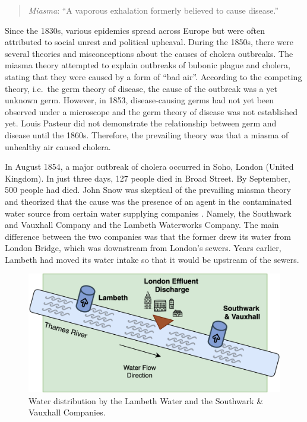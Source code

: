 \documentclass[
]{book}
\begin{document}
\begin{quote}
\emph{Miasma}: ``A vaporous exhalation formerly believed to cause disease.''
\end{quote}

Since the 1830s, various epidemics spread across Europe but were often attributed to social unrest and political upheaval. During the 1850s, there were several theories and misconceptions about the causes of cholera outbreaks. The miasma theory attempted to explain outbreaks of bubonic plague and cholera, stating that they were caused by a form of ``bad air''. According to the competing theory, i.e.~the germ theory of disease, the cause of the outbreak was a yet unknown germ. However, in 1853, disease-causing germs had not yet been observed under a microscope and the germ theory of disease was not established yet. Louis Pasteur did not demonstrate the relationship between germ and disease until the 1860s. Therefore, the prevailing theory was that a miasma of unhealthy air caused cholera.

In August 1854, a major outbreak of cholera occurred in Soho, London (United Kingdom). In just three days, 127 people died in Broad Street. By September, 500 people had died. John Snow was skeptical of the prevailing miasma theory and theorized that the cause was the presence of an agent in the contaminated water source from certain water supplying companies \citep{applied_stats_healthcare}. Namely, the Southwark and Vauxhall Company and the Lambeth Waterworks Company. The main difference between the two companies was that the former drew its water from London Bridge, which was downstream from London's sewers. Years earlier, Lambeth had moved its water intake so that it would be upstream of the sewers.



\begin{figure}

{\centering \includegraphics[width=0.66\linewidth]{Figures/JohnSnowRiver} 

}

\caption{Water distribution by the Lambeth Water and the Southwark \& Vauxhall Companies.}\label{fig:thames}
\end{figure}
\end{document}
